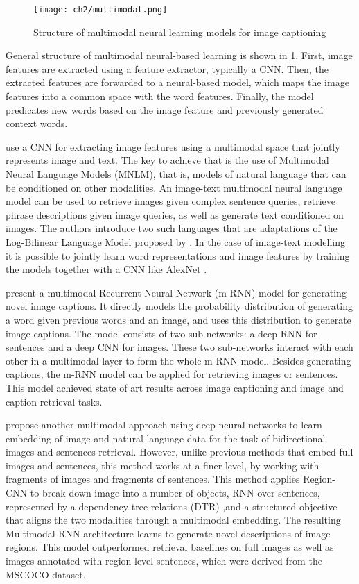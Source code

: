 \begin{figure}[hpt]
	\centering
	\texttt{[image: ch2/multimodal.png]}
	\caption{Structure of multimodal neural learning models for image captioning}
	\label{fig:multimodal}
\end{figure}

General structure of multimodal neural-based learning is shown in \ref{fig:multimodal}. First, image features are extracted using a feature extractor, typically a CNN. Then, the extracted features are forwarded to a neural-based model, which maps the image features into a common space with the word features. Finally, the model predicates new words based on the image feature and previously generated context words.

\citet{Kiros2014a} use a CNN for extracting image features using a multimodal space that jointly represents image and text. The key to achieve that is the use of Multimodal Neural Language Models (MNLM), that is, models of natural language that can be conditioned on other modalities. An image-text multimodal neural language model can be used to retrieve images given complex sentence queries, retrieve phrase descriptions given image queries, as well as generate text conditioned on images. The authors introduce two such languages that are adaptations of the Log-Bilinear Language Model proposed by \citep{Mnih2007}. In the case of image-text modelling it is possible to jointly learn word representations and image features by training the models together with a CNN like AlexNet \citep{Krizhevsky2012}.

\citet{Mao2014, Mao2015a} present a multimodal Recurrent Neural Network (m-RNN) model for generating novel image captions. It directly models the probability distribution of generating a word given previous words and an image, and uses this distribution to generate image captions. The model consists of two sub-networks: a deep RNN for sentences and a deep CNN for images. These two sub-networks interact with each other in a multimodal layer to form the whole m-RNN model. Besides generating captions, the m-RNN model can be applied for retrieving images or sentences. This model achieved state of art results across image captioning and image and caption retrieval tasks.

\citet{Karpathy2015} propose another multimodal approach using deep neural networks to learn embedding of image and natural language data for the task of bidirectional images and sentences retrieval. However, unlike previous methods that embed full images and sentences, this method works at a finer level, by working with fragments of images and fragments of sentences. This method applies Region-CNN to break down image into a number of objects, RNN over sentences, represented by a dependency tree relations (DTR) \citep{DeMarneffe2006},and a structured objective that aligns the two modalities through a multimodal embedding. The resulting Multimodal RNN architecture learns to generate novel descriptions of image regions. This model outperformed retrieval baselines on full images as well as images annotated with region-level sentences, which were derived from the MSCOCO dataset.
 
